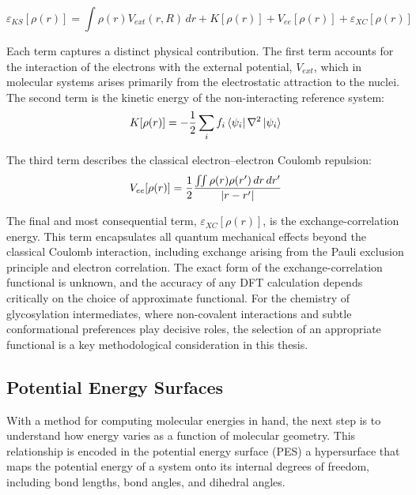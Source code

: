 \documentclass{article}
\begin{document}
\begin{equation}
    \varepsilon_{KS}[\rho(r)] = \int\rho(r)V_{ext}(r,R)\,dr + K[\rho(r)] + V_{ee}[\rho(r)] + \varepsilon_{XC}[\rho(r)]
\end{equation}

Each term captures a distinct physical contribution. The first term accounts for the interaction of the electrons with the external potential, $V_{ext}$, which in molecular systems arises primarily from the electrostatic attraction to the nuclei. The second term is the kinetic energy of the non-interacting reference system:
\begin{equation}
    K[\rho(r)] = -\frac{1}{2}\sum_i f_i\bra{\psi_i}\nabla^2\ket{\psi_i}
\end{equation}

The third term describes the classical electron--electron Coulomb repulsion:
\begin{equation}
    V_{ee}[\rho(r)] = \frac{1}{2}\frac{\iint\rho(r)\rho(r')\,dr\,dr'}{\abs{r-r'}}
\end{equation}

The final and most consequential term, $\varepsilon_{XC}[\rho(r)]$, is the exchange-correlation energy. This term encapsulates all quantum mechanical effects beyond the classical Coulomb interaction, including exchange arising from the Pauli exclusion principle and electron correlation. The exact form of the exchange-correlation functional is unknown, and the accuracy of any DFT calculation depends critically on the choice of approximate functional. For the chemistry of glycosylation intermediates, where non-covalent interactions and subtle conformational preferences play decisive roles, the selection of an appropriate functional is a key methodological consideration in this thesis.

\subsection{Potential Energy Surfaces}

With a method for computing molecular energies in hand, the next step is to understand how energy varies as a function of molecular geometry. This relationship is encoded in the potential energy surface (PES) a hypersurface that maps the potential energy of a system onto its internal degrees of freedom, including bond lengths, bond angles, and dihedral angles.
\end{document}
